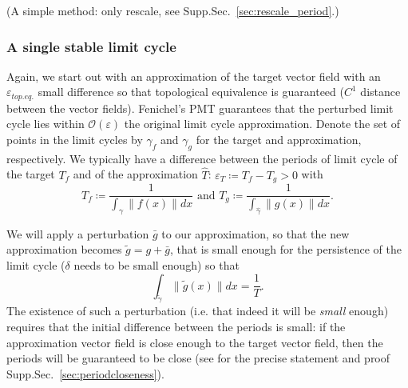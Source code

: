 \documentclass{article}
\newcommand{\ascomment}[1]{\textcolor{ascolor}{(#1)}}
\newcounter{ct}
\begin{document}
\ascomment{A simple method: only rescale, see Supp.Sec.~\ref{sec:rescale_period}.}

\subsubsection{A single stable limit cycle}
Again, we start out with an approximation of the target vector field with an $\varepsilon_{top.eq.}$ small difference so that topological equivalence is guaranteed ($C^1$ distance between the vector fields).
Fenichel's PMT guarantees that the perturbed limit cycle lies within $\mathcal{O}(\varepsilon)$ the original limit cycle approximation. %
Denote the set of points in the limit cycles by $\gamma_f$ and $\gamma_g$ for the target and approximation, respectively.
%
We typically have a difference between the periods of limit cycle of the target $T_f$ and of the approximation $\hat T$: $\varepsilon_T\coloneqq T_f- T_g>0$
with \[T_f\coloneqq\frac{1}{\int_{\gamma}\|f(x)\|dx} \text{ and } T_g\coloneqq\frac{1}{\int_{\hat{\gamma}}\|g(x)\|dx}.\]

We will apply a perturbation $\bar{g}$ to our approximation, so that the new approximation becomes $\tilde g = g + \bar g$, that is small enough for the persistence of the limit cycle ($\delta$ needs to be small enough) 
so that 
\begin{equation}\label{eq:lc_constraint}
\int_{\tilde{\gamma}}\|\tilde{g}(x)\| dx = \frac{1}{T}. 	%
\end{equation}
The existence of such a perturbation (i.e. that indeed it will be \emph{small} enough) requires that the initial difference between the periods is small:
if the approximation vector field is close enough to the target vector field, then the periods will be guaranteed to be close (see for the precise statement and proof Supp.Sec.~\ref{sec:periodcloseness}).
\end{document}
